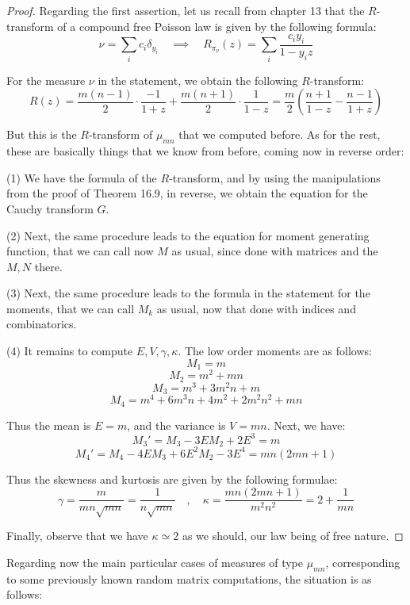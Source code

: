 \documentclass[12pt]{amsbook}
\begin{document}
\begin{proof}
Regarding the first assertion, let us recall from chapter 13 that the $R$-transform of a compound free Poisson law is given by the following formula:
$$\nu=\sum_ic_i\delta_{y_i}\quad\implies\quad R_{\pi_{\nu}}(z)=\sum_i\frac{c_iy_i}{1-y_iz}$$

For the measure $\nu$ in the statement, we obtain the following $R$-transform:
$$R(z)=\frac{m(n-1)}{2}\cdot\frac{-1}{1+z}+\frac{m(n+1)}{2}\cdot\frac{1}{1-z}
=\frac{m}{2}\left(\frac{n+1}{1-z}-\frac{n-1}{1+z}\right)$$

But this is the $R$-transform of $\mu_{mn}$ that we computed before. As for the rest, these are basically things that we know from before, coming now in reverse order:

\medskip

(1) We have the formula of the $R$-transform, and by using the manipulations from the proof of Theorem 16.9, in reverse, we obtain the equation for the Cauchy transform $G$. 

\medskip

(2) Next, the same procedure leads to the equation for moment generating function, that we can call now $M$ as usual, since done with matrices and the $M,N$ there. 

\medskip

(3) Next, the same procedure leads to the formula in the statement for the moments, that we can call $M_k$ as usual, now that done with indices and combinatorics.

\medskip

(4) It remains to compute $E,V,\gamma,\kappa$. The low order moments are as follows:
$$M_1=m$$
$$M_2=m^2+mn$$
$$M_3=m^3+3m^2n+m$$
$$M_4=m^4+6m^3n+4m^2+2m^2n^2+mn$$

Thus the mean is $E=m$, and the variance is $V=mn$. Next, we have:
$$M_3'=M_3-3EM_2+2E^3=m$$
$$M_4'=M_4-4EM_3+6E^2M_2-3E^4=mn(2mn+1)$$ 

Thus the skewness and kurtosis are given by the following formulae:
$$\gamma=\frac{m}{mn\sqrt{mn}}
=\frac{1}{n\sqrt{mn}}\quad,\quad  
\kappa=\frac{mn(2mn+1)}{m^2n^2}
=2+\frac{1}{mn}$$

Finally, observe that we have $\kappa\simeq 2$ as we should, our law being of free nature. 
\end{proof}

Regarding now the main particular cases of measures of type $\mu_{mn}$, corresponding to some previously known random matrix computations, the situation is as follows:
\end{document}

